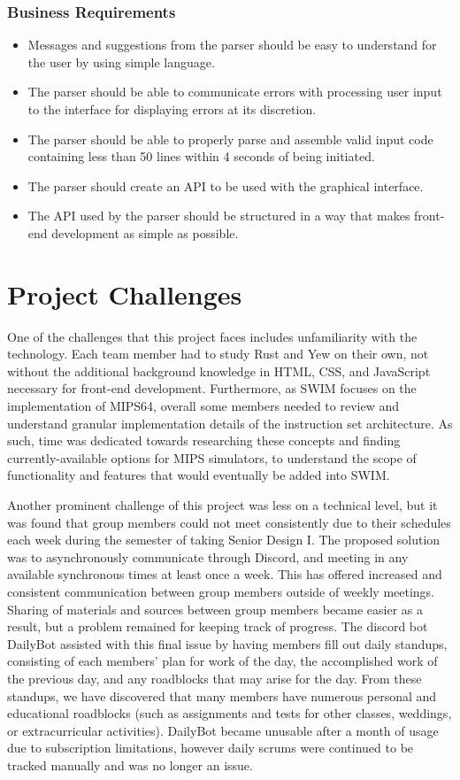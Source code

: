\documentclass[
    paper=letter,
    parskip=half,
    fontsize=12pt,
    titlepage=firstiscover,
    toc=bibliography,
    numbers=endperiod
]{scrartcl}
\let\oldsection\section
\renewcommand{\section}{\newpage\oldsection}
\begin{document}
\subsubsection{Business Requirements}
\begin{itemize}
    \item Messages and suggestions from the parser should be easy to understand
          for the user by using simple language.
    \item The parser should be able to communicate errors with processing user
          input to the interface for displaying errors at its discretion.
    \item The parser should be able to properly parse and assemble valid input
          code containing less than 50 lines within 4 seconds of being initiated.
    \item The parser should create an API to be used with the graphical interface.
    \item The API used by the parser should be structured in a way that makes
          front-end development as simple as possible.
\end{itemize}

\section{Project Challenges}

One of the challenges that this project faces includes unfamiliarity
with the technology. Each team member had to study Rust and Yew on their
own, not without the additional background knowledge in HTML, CSS, and
JavaScript necessary for front-end development. Furthermore, as SWIM
focuses on the implementation of MIPS64, overall some members needed to
review and understand granular implementation details of the instruction
set architecture. As such, time was dedicated towards researching these
concepts and finding currently-available options for MIPS simulators, to
understand the scope of functionality and features that would eventually
be added into SWIM.

Another prominent challenge of this project was less on a technical
level, but it was found that group members could not meet consistently
due to their schedules each week during the semester of taking Senior
Design I. The proposed solution was to asynchronously communicate
through Discord, and meeting in any available synchronous times at least
once a week. This has offered increased and consistent communication
between group members outside of weekly meetings. Sharing of materials
and sources between group members became easier as a result, but a
problem remained for keeping track of progress. The discord bot DailyBot
assisted with this final issue by having members fill out daily
standups, consisting of each members' plan for work of the day, the
accomplished work of the previous day, and any roadblocks that may arise
for the day. From these standups, we have discovered that many members
have numerous personal and educational roadblocks (such as assignments
and tests for other classes, weddings, or extracurricular activities).
DailyBot became unusable after a month of usage due to subscription
limitations, however daily scrums were continued to be tracked manually
and was no longer an issue.
\end{document}
